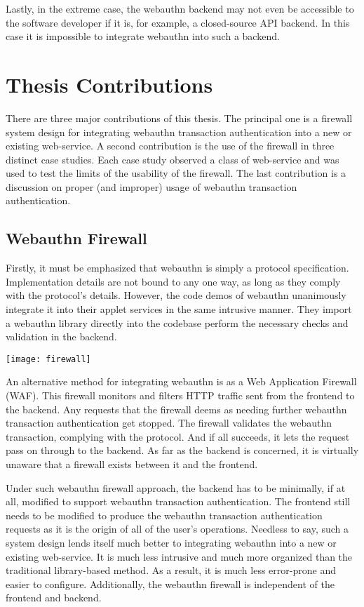 Lastly, in the extreme case, the webauthn backend may not even be accessible to the software developer if it is, for example, a closed-source API backend. In this case it is impossible to integrate webauthn into such a backend.

\section{Thesis Contributions}

There are three major contributions of this thesis. The principal one is a firewall system design for integrating webauthn transaction authentication into a new or existing web-service. A second contribution is the use of the firewall in three distinct case studies. Each case study observed a class of web-service and was used to test the limits of the usability of the firewall. The last contribution is a discussion on proper (and improper) usage of webauthn transaction authentication.

\subsection{Webauthn Firewall}

Firstly, it must be emphasized that webauthn is simply a protocol specification. Implementation details are not bound to any one way, as long as they comply with the protocol's details. However, the code demos of webauthn unanimously integrate it into their applet services in the same intrusive manner. They import a webauthn library \cite{TODO-webauthn-libraries} directly into the codebase perform the necessary checks and validation in the backend.

\begin{center}
\texttt{[image: firewall]}
\end{center}

An alternative method for integrating webauthn is as a Web Application Firewall (WAF). This firewall monitors and filters HTTP traffic sent from the frontend to the backend. Any requests that the firewall deems as needing further webauthn transaction authentication get stopped. The firewall validates the webauthn transaction, complying with the protocol. And if all succeeds, it lets the request pass on through to the backend. As far as the backend is concerned, it is virtually unaware that a firewall exists between it and the frontend. 

Under such webauthn firewall approach, the backend has to be minimally, if at all, modified to support webauthn transaction authentication. The frontend still needs to be modified to produce the webauthn transaction authentication requests as it is the origin of all of the user's operations. Needless to say, such a system design lends itself much better to integrating webauthn into a new or existing web-service. It is much less intrusive and much more organized than the traditional library-based method. As a result, it is much less error-prone and easier to configure. Additionally, the webauthn firewall is independent of the frontend and backend. 


